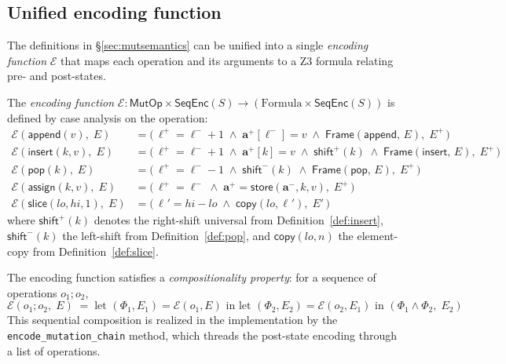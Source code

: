 \documentclass[11pt]{article}
\newcommand{\SeqEnc}[1]{\mathsf{SeqEnc}(#1)}
\newcommand{\arrvar}[1]{\mathbf{a}_{#1}}
\newcommand{\lenvar}[1]{\ell_{#1}}
\newcommand{\MutApp}{\ensuremath{\mathsf{append}}}
\newcommand{\MutIns}{\ensuremath{\mathsf{insert}}}
\newcommand{\MutPop}{\ensuremath{\mathsf{pop}}}
\newcommand{\MutSlice}{\ensuremath{\mathsf{slice}}}
\newcommand{\MutAssign}{\ensuremath{\mathsf{assign}}}
\newcommand{\MutOp}{\ensuremath{\mathsf{MutOp}}}
\newcommand{\prestate}[1]{#1^{-}}
\newcommand{\poststate}[1]{#1^{+}}
\newcommand{\Frame}[2]{\mathsf{Frame}(#1,\,#2)}
\begin{document}
\subsection{Unified encoding function}\label{sec:encfunc}

The definitions in \S\ref{sec:mutsemantics} can be unified into a single
\emph{encoding function} $\mathcal{E}$ that maps each operation and its
arguments to a Z3 formula relating pre- and post-states.

\begin{definition}\label{def:encfunc}
The \emph{encoding function}
$\mathcal{E} : \MutOp \times \SeqEnc{S} \to
(\mathrm{Formula} \times \SeqEnc{S})$
is defined by case analysis on the operation:
\begin{align*}
  \mathcal{E}(\MutApp(v),\; E) &= \bigl(\,
    \poststate{\lenvar{}} = \prestate{\lenvar{}} + 1 \;\wedge\;
    \poststate{\arrvar{}}[\prestate{\lenvar{}}] = v \;\wedge\;
    \Frame{\MutApp}{E},\; \poststate{E}\,\bigr)
  \\[4pt]
  \mathcal{E}(\MutIns(k,v),\; E) &= \bigl(\,
    \poststate{\lenvar{}} = \prestate{\lenvar{}} + 1 \;\wedge\;
    \poststate{\arrvar{}}[k] = v \;\wedge\;
    \mathsf{shift}^{+}(k) \;\wedge\;
    \Frame{\MutIns}{E},\; \poststate{E}\,\bigr)
  \\[4pt]
  \mathcal{E}(\MutPop(k),\; E) &= \bigl(\,
    \poststate{\lenvar{}} = \prestate{\lenvar{}} - 1 \;\wedge\;
    \mathsf{shift}^{-}(k) \;\wedge\;
    \Frame{\MutPop}{E},\; \poststate{E}\,\bigr)
  \\[4pt]
  \mathcal{E}(\MutAssign(k,v),\; E) &= \bigl(\,
    \poststate{\lenvar{}} = \prestate{\lenvar{}} \;\wedge\;
    \poststate{\arrvar{}} = \mathsf{store}(\prestate{\arrvar{}},k,v),\;
    \poststate{E}\,\bigr)
  \\[4pt]
  \mathcal{E}(\MutSlice(lo,hi,1),\; E) &= \bigl(\,
    \lenvar{}' = hi - lo \;\wedge\;
    \mathsf{copy}(lo,\lenvar{}'),\; E'\,\bigr)
\end{align*}
where $\mathsf{shift}^{+}(k)$ denotes the right-shift universal from
Definition~\ref{def:insert}, $\mathsf{shift}^{-}(k)$ the left-shift from
Definition~\ref{def:pop}, and $\mathsf{copy}(lo,n)$ the element-copy from
Definition~\ref{def:slice}.
\end{definition}

The encoding function satisfies a \emph{compositionality property}: for a
sequence of operations $o_1; o_2$,
\[
  \mathcal{E}(o_1; o_2,\; E)
  \;=\;
  \text{let } (\Phi_1, E_1) = \mathcal{E}(o_1, E) \text{ in }
  \text{let } (\Phi_2, E_2) = \mathcal{E}(o_2, E_1) \text{ in }
  (\Phi_1 \wedge \Phi_2,\; E_2)
\]
This sequential composition is realized in the implementation by the
\texttt{encode\_mutation\_chain} method, which threads the post-state
encoding through a list of operations.
\end{document}
